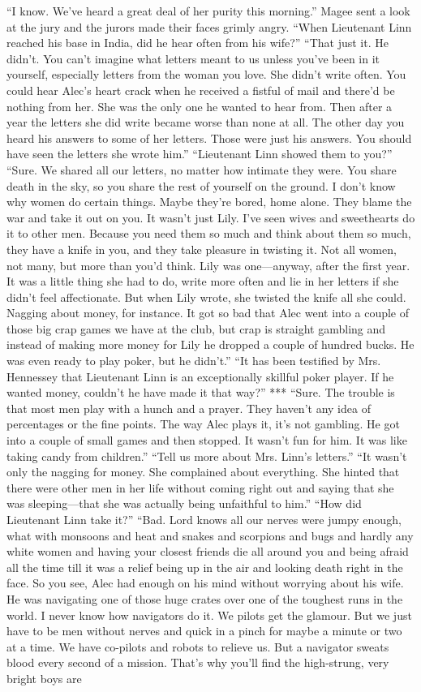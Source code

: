 \documentclass{novel}
\begin{document}
“I know. We’ve heard a great deal of her purity this morning.” Magee sent a look at the jury and the jurors made their faces grimly angry. “When Lieutenant Linn reached his base in India, did he hear often from his wife?” “That just it. He didn’t. You can’t imagine what letters meant to us unless you’ve been in it yourself, especially letters from the woman you love. She didn’t write often. You could hear Alec’s heart crack when he received a fistful of mail and there’d be nothing from her. She was the only one he wanted to hear from. Then after a year the letters she did write became worse than none at all. The other day you heard his answers to some of her letters. Those were just his answers. You should have seen the letters she wrote him.” “Lieutenant Linn showed them to you?” “Sure. We shared all our letters, no matter how intimate they were. You share death in the sky, so you share the rest of yourself on the ground. I don’t know why women do certain things. Maybe they’re bored, home alone. They blame the war and take it out on you. It wasn’t just Lily. I’ve seen wives and sweethearts do it to other men. Because you need them so much and think about them so much, they have a knife in you, and they take pleasure in twisting it. Not all women, not many, but more than you’d think. Lily was one—anyway, after the first year. It was a little thing she had to do, write more often and lie in her letters if she didn’t feel affectionate. But when Lily wrote, she twisted the knife all she could. Nagging about money, for instance. It got so bad that Alec went into a couple of those big crap games we have at the club, but crap is straight gambling and instead of making more money for Lily he dropped a couple of hundred bucks. He was even ready to play poker, but he didn’t.” “It has been testified by Mrs. Hennessey that Lieutenant Linn is an exceptionally skillful poker player. If he wanted money, couldn’t he have made it that way?” *** “Sure. The trouble is that most men play with a hunch and a prayer. They haven’t any idea of percentages or the fine points. The way Alec plays it, it’s not gambling. He got into a couple of small games and then stopped. It wasn’t fun for him. It was like taking candy from children.” “Tell us more about Mrs. Linn’s letters.” “It wasn’t only the nagging for money. She complained about everything. She hinted that there were other men in her life without coming right out and saying that she was sleeping—that she was actually being unfaithful to him.” “How did Lieutenant Linn take it?” “Bad. Lord knows all our nerves were jumpy enough, what with monsoons and heat and snakes and scorpions and bugs and hardly any white women and having your closest friends die all around you and being afraid all the time till it was a relief being up in the air and looking death right in the face. So you see, Alec had enough on his mind without worrying about his wife. He was navigating one of those huge crates over one of the toughest runs in the world. I never know how navigators do it. We pilots get the glamour. But we just have to be men without nerves and quick in a pinch for maybe a minute or two at a time. We have co-pilots and robots to relieve us. But a navigator sweats blood every second of a mission. That’s why you’ll find the high-strung, very bright boys are 
\end{document}
